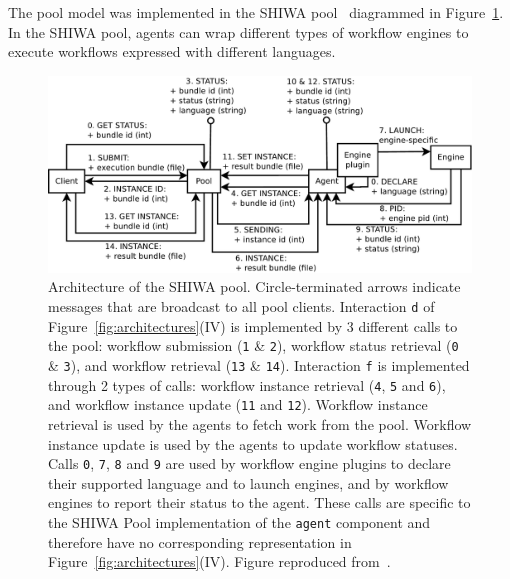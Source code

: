 \documentclass[preprint,3p,twocolumn]{elsarticle}
\newcommand{\note}[2]{\pdfmargincomment[color=yellow,author=#1,open=true]{#2}}
\newcommand{\closednote}[4]{} %
\begin{document}
The pool model was implemented in the SHIWA pool~\cite{ROGE-13}
diagrammed in Figure~\ref{fig:shiwa-pool-architecture}. In the SHIWA
pool, agents can wrap different types of workflow engines to execute
workflows expressed with different languages.

\begin{figure}
\centering
\includegraphics[width=1.5\columnwidth]{figures/pool-interactions.pdf}
\caption{Architecture of the SHIWA pool. Circle-terminated arrows
  indicate messages that are broadcast to all pool
  clients. Interaction \texttt{d} of Figure~\ref{fig:architectures}(IV) is
  implemented by 3 different calls to the pool: workflow
  submission (\texttt{1} \& \texttt{2}), workflow status retrieval
  (\texttt{0} \& \texttt{3})\closednote{sorina}{I suppose letters come
    here from the initial pool-model figure; it's a bit puzzling when
    mixed with letters from Fig 2}{Tristan}{Fixed.}, and workflow
  retrieval (\texttt{13} \& \texttt{14}). \closednote{Marc-e}{Maybe
    easier to follow if the following would be in fig legend instead
    of here, as for 2 previous figures}{Tristan}{fixed} Interaction
  \texttt{f} is implemented through 2 types of calls: workflow
  instance retrieval (\texttt{4}, \texttt{5} and \texttt{6}), and
  workflow instance update (\texttt{11} and \texttt{12}). Workflow
  instance retrieval is used by the agents to fetch work from the
  pool. Workflow instance update is used by the agents to update
  workflow statuses.  Calls \texttt{0}, \texttt{7}, \texttt{8} and
  \texttt{9} are used by
  workflow engine plugins to declare their supported language and to
  launch engines, and by workflow engines to report their status to
  the agent. These calls are specific to the SHIWA Pool implementation
  of the \texttt{agent} component and therefore have no corresponding
  representation in Figure~\ref{fig:architectures}(IV). Figure reproduced
  from~\cite{ROGE-13}.}
\label{fig:shiwa-pool-architecture}
\end{figure}
\end{document}
